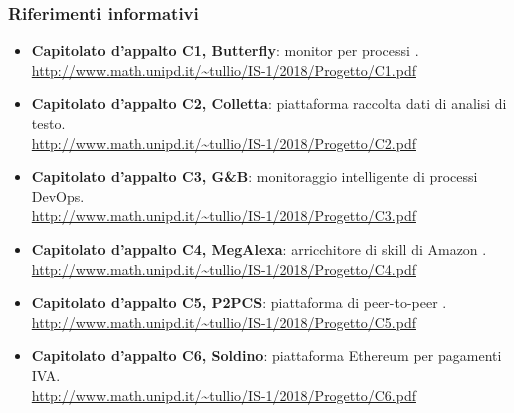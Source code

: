         \subsubsection{Riferimenti informativi}
            \begin{itemize}
                \item \textbf{Capitolato d'appalto C1, Butterfly}:
                    monitor per processi . \\
                    \url{http://www.math.unipd.it/~tullio/IS-1/2018/Progetto/C1.pdf}
                \item \textbf{Capitolato d'appalto C2, Colletta}:
                    piattaforma raccolta dati di analisi di testo. \\
                    \url{http://www.math.unipd.it/~tullio/IS-1/2018/Progetto/C2.pdf}
                \item \textbf{Capitolato d'appalto C3, G\&B}:
                    monitoraggio intelligente di processi DevOps. \\
                    \url{http://www.math.unipd.it/~tullio/IS-1/2018/Progetto/C3.pdf}
                \item \textbf{Capitolato d'appalto C4, MegAlexa}:
                    arricchitore di skill di Amazon . \\
                    \url{http://www.math.unipd.it/~tullio/IS-1/2018/Progetto/C4.pdf}
                \item \textbf{Capitolato d'appalto C5, P2PCS}:
                    piattaforma di peer-to-peer . \\
                    \url{http://www.math.unipd.it/~tullio/IS-1/2018/Progetto/C5.pdf}
                \item \textbf{Capitolato d'appalto C6, Soldino}:
                    piattaforma Ethereum per pagamenti IVA. \\
                    \url{http://www.math.unipd.it/~tullio/IS-1/2018/Progetto/C6.pdf}
            \end{itemize}
